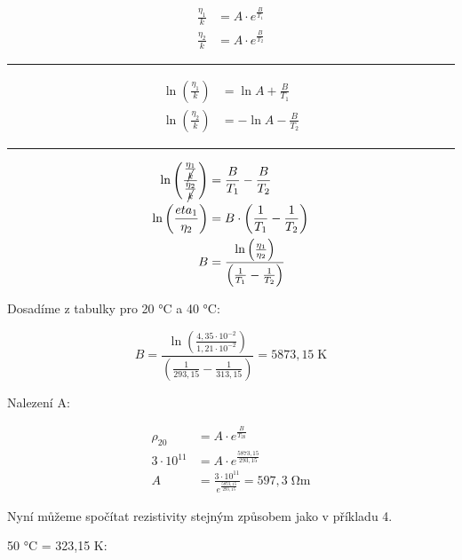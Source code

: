 \begin{align*}
    \frac{\eta_1}{k} &= A \cdot e^\frac{B}{T_1}\\
    \frac{\eta_2}{k} &= A \cdot e^\frac{B}{T_2}
\end{align*}

\begin{center}
    \noindent\rule{5cm}{0.4pt}
\end{center}

\begin{align*}
    \ln \left( \frac{\eta_1}{k} \right) & = \ln A + \frac{B}{T_1}\\
    \ln \left( \frac{\eta_2}{k} \right) & = - \ln A - \frac{B}{T_2}
\end{align*}

\begin{center}
    \noindent\rule{5cm}{0.4pt}
\end{center}

\newpage

\begin{align*}
    \ln \left( \frac{\frac{\eta_1}{\cancel{k}}}{\frac{\eta_2}{\cancel{k}}} \right) &= \frac{B}{T_1} - \frac{B}{T_2} \\
    \ln \left( \frac{eta_1}{\eta_2} \right) &= B \cdot \left( \frac{1}{T_1} - \frac{1}{T_2} \right) \\
    B &= \frac{\ln \left( \frac{\eta_1}{\eta_2} \right)}{\left( \frac{1}{T_1} - \frac{1}{T_2} \right)}
\end{align*}

Dosadíme z tabulky pro 20 \si{\celsius} a 40 \si{\celsius}:

\begin{equation*}
    B = \frac{\ln \left( \frac{4,35 \cdot 10^{-2}}{1,21 \cdot 10^{-2}} \right)}{\left( \frac{1}{293,15} - \frac{1}{313,15} \right)} = 5873,15 \; \si{\kelvin}
\end{equation*}

Nalezení A:

\begin{align*}
    \rho_{20} &= A \cdot e^{\frac{B}{T_{20}}} \\
    3 \cdot 10^{11} &= A \cdot e^\frac{5873,15}{293,15} \\
    A &= \frac{3 \cdot 10^{11}}{e^\frac{5873,15}{293,15}} = 597,3 \; \si{\ohm\meter}
\end{align*}

Nyní můžeme spočítat rezistivity stejným způsobem jako v příkladu 4.

50 \si{\celsius} = 323,15 \si{\kelvin}:

